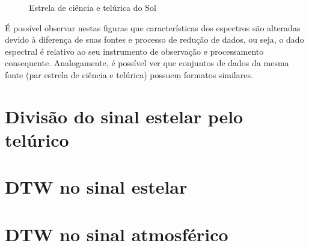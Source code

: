 \begin{figure}[htb]
  \centering
  \hfill
  \caption{Estrela de ciência e telúrica do Sol}
  \label{fig:two-stars-sun}
\end{figure}

É possível observar nestas figuras que características dos espectros são alteradas devido à diferença de suas fontes e processo de redução de dados, ou seja, o dado espectral é relativo ao seu instrumento de observação e processamento consequente. Analogamente, é possível ver que conjuntos de dados da mesma fonte (par estrela de ciência e telúrica) possuem formatos similares.


\section{Divisão do sinal estelar pelo telúrico}



\section{DTW no sinal estelar}

\section{DTW no sinal atmosférico}